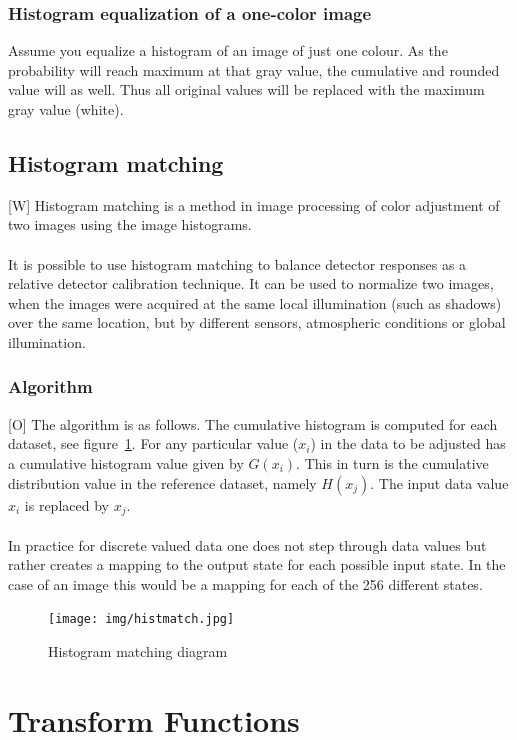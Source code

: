 \documentclass[12pt]{article}
\begin{document}
	\subsubsection{Histogram equalization of a one-color image}
	Assume you equalize a histogram of an image of just one colour. As the probability will reach maximum
	at that gray value, the cumulative and rounded value will as well. Thus all original values will be 
	replaced with the maximum gray value (white).
	\subsection{Histogram matching}
	[W] Histogram matching is a method in image processing of color adjustment of two images using 
	the image histograms.\\
	\\
	It is possible to use histogram matching to balance detector responses as a relative detector 
	calibration technique. It can be used to normalize two images, when the images were acquired at 
	the same local illumination (such as shadows) over the same location, but by different sensors, 
	atmospheric conditions or global illumination.\\
	
	\subsubsection{Algorithm}
	[O] The algorithm is as follows. The cumulative histogram is computed for each dataset, see 
	figure~\ref{fig:histogram_matching}. For any particular value ($x_i$) in the data to be adjusted 
	has a cumulative histogram value given 
	by $G(x_i)$. This in turn is the cumulative distribution value in the reference dataset, namely $H(x_j)$. 
	The input data value $x_i$ is replaced by $x_j$. \\
    \\
    In practice for discrete valued data one does not step through data values but rather creates a 
    mapping to the output state for each possible input state. In the case of an image this would be a 
    mapping for each of the 256 different states. 
	\begin{figure}[h!]
		\centering
		\texttt{[image: img/histmatch.jpg]}
		\caption{Histogram matching diagram}		
		\label{fig:histogram_matching}
	\end{figure}
%	
%	
\section{Transform Functions}
\end{document}
